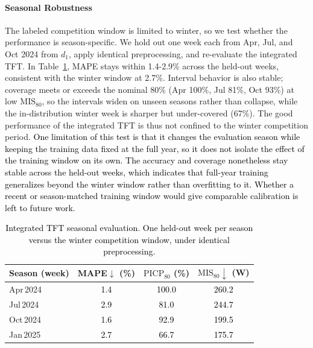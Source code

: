 \documentclass[final,10pt,1p,authoryear]{elsarticle}
\theoremstyle{definition}
\begin{document}
\paragraph{Seasonal Robustness}
The labeled competition window is limited to winter, so we test whether the performance is season-specific. We hold out one week each from Apr, Jul, and Oct 2024 from $d_1$, apply identical preprocessing, and re-evaluate the integrated TFT. In Table~\ref{tab:seasonal}, MAPE stays within 1.4-2.9\% across the held-out weeks, consistent with the winter window at 2.7\%. Interval behavior is also stable; coverage meets or exceeds the nominal 80\% (Apr 100\%, Jul 81\%, Oct 93\%) at low $\mathrm{MIS}_{80}$, so the intervals widen on unseen seasons rather than collapse, while the in-distribution winter week is sharper but under-covered (67\%). The good performance of the integrated TFT is thus not confined to the winter competition period. \textcolor{black}{One limitation of this test is that it changes the evaluation season while keeping the training data fixed at the full year, so it does not isolate the effect of the training window on its own. The accuracy and coverage nonetheless stay stable across the held-out weeks, which indicates that full-year training generalizes beyond the winter window rather than overfitting to it. Whether a recent or season-matched training window would give comparable calibration is left to future work.}

\begin{table}[!htbp]
\centering
\caption{\textcolor{black}{Integrated TFT seasonal evaluation. One held-out week per season versus the winter competition window, under identical preprocessing.}}
\label{tab:seasonal}
\begin{tabular}{lccc}\toprule
Season (week) & MAPE$\downarrow$ (\%) & $\mathrm{PICP}_{80}$ (\%) & $\mathrm{MIS}_{80}\downarrow$ (W) \\
\midrule
Apr\,2024 & \textcolor{black}{1.4} & \textcolor{black}{100.0} & \textcolor{black}{260.2} \\
Jul\,2024 & \textcolor{black}{2.9} & \textcolor{black}{81.0} & \textcolor{black}{244.7} \\
Oct\,2024 & \textcolor{black}{1.6} & \textcolor{black}{92.9} & \textcolor{black}{199.5} \\
Jan\,2025 & \textcolor{black}{2.7} & \textcolor{black}{66.7} & \textcolor{black}{175.7} \\
\bottomrule
\end{tabular}
\end{table}
\end{document}
